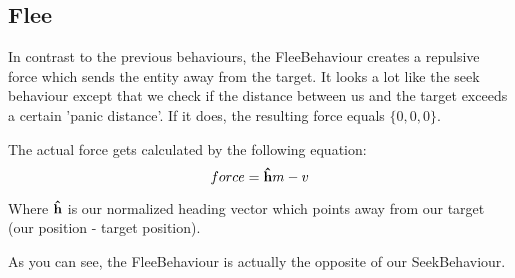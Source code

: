 \subsection{Flee}
In contrast to the previous behaviours, the FleeBehaviour creates a repulsive 
force which sends the entity away from the target. It looks a lot like the 
seek behaviour except that we check if the distance between us and the target 
exceeds a certain 'panic distance'. If it does, the resulting force equals 
$ \{0, 0, 0\} $. 

The actual force gets calculated by the following equation:
\large
$$ force = \boldsymbol{\hat{\textbf{h}}} m - v $$
\normalsize

Where $ \boldsymbol{\hat{\textbf{h}}} $ is our normalized heading vector which points away from 
our target (our position - target position).

As you can see, the FleeBehaviour is actually the opposite of our 
SeekBehaviour. \cite[pg. 92]{buckland}

